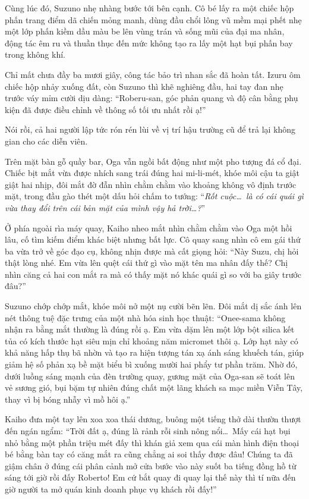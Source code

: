 \documentclass[../main.tex]{subfiles}
\begin{document}
Cùng lúc đó, Suzuno nhẹ nhàng bước tới bên cạnh. Cô bé lấy ra một chiếc hộp phấn trang điểm dã chiến mỏng manh, dùng đầu chổi lông vũ mềm mại phết nhẹ một lớp phấn kiềm dầu màu be lên vùng trán và sống mũi của đại ma nhân, động tác êm ru và thuần thục đến mức không tạo ra lấy một hạt bụi phấn bay trong không khí.

Chỉ mất chưa đầy ba mươi giây, công tác bảo trì nhan sắc đã hoàn tất. Izuru ôm chiếc hộp nhảy xuống đất, còn Suzuno thì khẽ nghiêng đầu, hai tay đan nhẹ trước váy mỉm cười dịu dàng: ``Roberu-san, góc phản quang và độ cân bằng phụ kiện đã được điều chỉnh về thông số tối ưu nhất rồi ạ!''

Nói rồi, cả hai người lập tức rón rén lùi về vị trí hậu trường cũ để trả lại không gian cho các diễn viên.

Trên mặt bàn gỗ quầy bar, Oga vẫn ngồi bất động như một pho tượng đá cổ đại. Chiếc bịt mắt vừa được nhích sang trái đúng hai mi-li-mét, khóe môi cậu ta giật giật hai nhịp, đôi mắt đờ đẫn nhìn chằm chằm vào khoảng không vô định trước mặt, trong đầu gào thét một dấu hỏi chấm to tướng: ``\textit{Rốt cuộc\dots\ là có cái quái gì vừa thay đổi trên cái bản mặt của mình vậy hả trời\dots?}''

Ở phía ngoài rìa máy quay, Kaiho nheo mắt nhìn chằm chằm vào Oga một hồi lâu, cố tìm kiếm điểm khác biệt nhưng bất lực. Cô quay sang nhìn cô em gái thứ ba vừa trở về góc đạo cụ, không nhịn được mà cất giọng hỏi: ``Này Suzu, chị hỏi thật lòng nhé. Em vừa lên quệt cái thứ gì vào mặt tên ma nhân đấy thế? Chị nhìn căng cả hai con mắt ra mà có thấy mặt nó khác quái gì so với ba giây trước đâu?''

Suzuno chớp chớp mắt, khóe môi nở một nụ cười bẽn lẽn. Đôi mắt dị sắc ánh lên nét thông tuệ đặc trưng của một nhà hóa sinh học thuật: ``Onee-sama không nhận ra bằng mắt thường là đúng rồi ạ. Em vừa dặm lên một lớp bột silica kết tủa có kích thước hạt siêu mịn chỉ khoảng năm micromet thôi ạ. Lớp hạt này có khả năng hấp thụ bã nhờn và tạo ra hiện tượng tán xạ ánh sáng khuếch tán, giúp giảm hệ số phản xạ bề mặt biểu bì xuống mười hai phẩy tư phần trăm. Nhờ đó, dưới luồng sáng mạnh của đèn trường quay, gương mặt của Oga-san sẽ toát lên vẻ sương gió, bụi bặm tự nhiên đúng chất một lãng khách sa mạc miền Viễn Tây, thay vì bị bóng nhẫy vì mồ hôi ạ.''

Kaiho đưa một tay lên xoa xoa thái dương, buông một tiếng thở dài thườn thượt đến ngán ngẩm: ``Trời đất ạ, đúng là rảnh rỗi sinh nông nổi\dots\ Mấy cái hạt bụi nhỏ bằng một phần triệu mét đấy thì khán giả xem qua cái màn hình điện thoại bé bằng bàn tay có căng mắt ra cũng chẳng ai soi thấy được đâu! Chúng ta đã giậm chân ở đúng cái phân cảnh mở cửa bước vào này suốt ba tiếng đồng hồ từ sáng tới giờ rồi đấy Roberto! Em cứ bắt quay đi quay lại thế này thì tí nữa đến giờ người ta mở quán kinh doanh phục vụ khách rồi đấy!''
\end{document}
